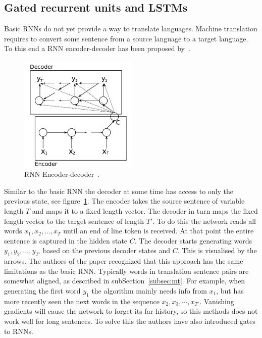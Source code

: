 \subsection{Gated recurrent units and LSTMs}
\label{subsec:gru}
Basic RNNs do not yet provide a way to translate languages.
Machine translation requires to convert some sentence from a source language to a target language.
To this end a RNN encoder-decoder has been proposed by~\citet{cho2014learning}.

\begin{figure}[htbp]
    \begin{center}
        \includegraphics[width=0.5\textwidth]{figures/encoder_decoder.png}
    \end{center}
    \caption{RNN Encoder-decoder~\cite[Figure 1]{cho2014learning}.}
    \label{fig:encoder_decoder}
\end{figure}

Similar to the basic RNN the decoder at some time has access to only the previous state, see figure~\ref{fig:encoder_decoder}.
The encoder takes the source sentence of variable length $T$ and maps it to a fixed length vector.
The decoder in turn maps the fixed length vector to the target sentence of length $T'$.
To do this the network reads all words $x_1, x_2, \ldots, x_T$ until an end of line token is received.
At that point the entire sentence is captured in the hidden state $C$.
The decoder starts generating words $y_1, y_2, \ldots, y_{T'}$ based on the previous decoder states and $C$.
This is visualised by the arrows.
The authors of the paper recognized that this approach has the same limitations as the basic RNN.
Typically words in translation sentence pairs are somewhat aligned, as described in subSection~\ref{subsec:mt}.
For example, when generating the first word $y_1$ the algorithm mainly needs info from $x_1$, but has more recently seen the next words in the sequence $x_2, x_3, \cdots, x_{T'}$.
Vanishing gradients will cause the network to forget its far history, so this methods does not work well for long sentences.
To solve this the authors have also introduced gates to RNNs.

